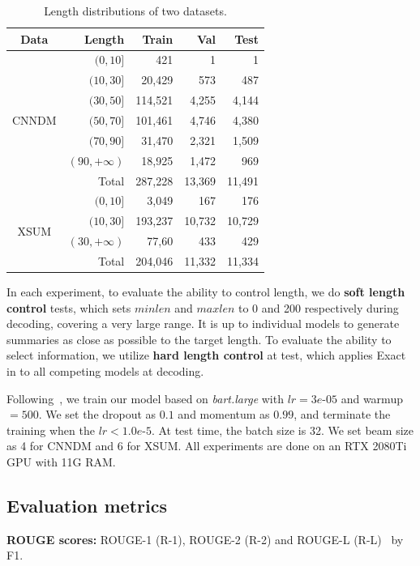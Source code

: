 \begin{table}[th]
	\scriptsize
	\centering
	\begin{tabular}{|c|r|rrr|}
		\hline
		\bf Data& \bf Length& \bf Train & \bf Val & \bf Test \\ 
		\hline
		\multirow{7}{*}{CNNDM} 
		&$(0,10]$ & 421 &1 &1 \\
		& $(10,30]$ & 20,429&573 & 487\\
		& $(30,50]$ & 114,521 &4,255&4,144 \\
		& $(50,70]$& 101,461 & 4,746 &4,380 \\
		& $(70,90]$ & 31,470 & 2,321 & 1,509\\
		& $(90,+\infty)$ & 18,925&1,472 &969 \\
		\cline{2-5}
		&Total &287,228&13,369&11,491 \\
		\hline
		\multirow{4}{*}{XSUM} 
		&$(0,10]$ & 3,049 & 167 & 176 \\
		& $(10,30]$ & 193,237 & 10,732 & 10,729 \\
		& $(30,+\infty)$ & 77,60 & 433 & 429 \\
		\cline{2-5}
		&Total &204,046&11,332&11,334\\
		\hline
	\end{tabular}
	\caption{Length distributions of two datasets.}
	\label{tab:lendis}
\end{table}


In each experiment, to evaluate the ability to control length, 
we do {\bf soft length control} tests, %
which sets $minlen$ and $maxlen$ to 0 and 200 respectively
during decoding, covering a very large range. It is up to
individual models to generate summaries as close as possible to the
target length.
To evaluate the ability to select information, 
we utilize {\bf hard length control} at test, 
which applies Exact in  to all competing models
at decoding.

Following~\citet{BART19},
we train our model based on  {\em bart.large} with
$lr=3e$-$05$ and warmup $=500$.
We set the dropout as $0.1$ and momentum as $0.99$,
and terminate the training when the $lr < 1.0e$-$5$. 
At test time, the batch size is 32. 
We set beam size as 4 for CNNDM and 6 for XSUM.
All experiments are done on an RTX 2080Ti GPU with 11G RAM. 

\subsection{Evaluation metrics}
\noindent\textbf{ROUGE scores:} 
ROUGE-1 (R-1), ROUGE-2 (R-2) and ROUGE-L (R-L)~\cite{rouge} by F1.

